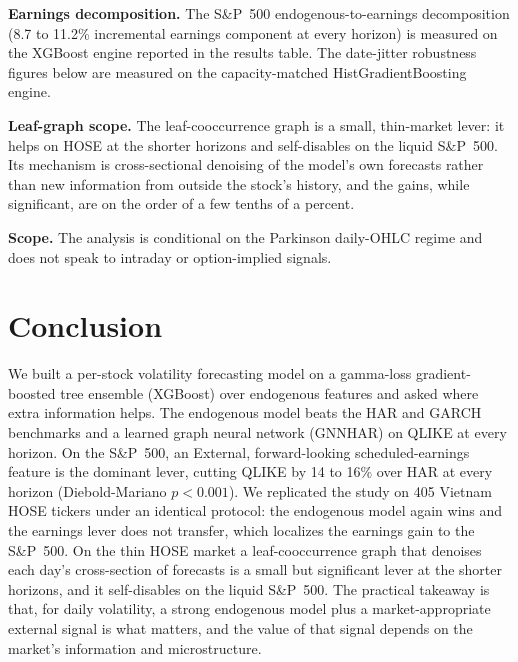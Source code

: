 \documentclass[runningheads]{llncs}
\begin{document}
\noindent\textbf{Earnings decomposition.} The S\&P~500 endogenous-to-earnings decomposition (8.7 to
11.2\% incremental earnings component at every horizon) is measured on the XGBoost engine reported in the
results table. The date-jitter robustness figures below are measured on the capacity-matched
HistGradientBoosting engine.

\noindent\textbf{Leaf-graph scope.} The leaf-cooccurrence graph is a small, thin-market lever: it helps
on HOSE at the shorter horizons and self-disables on the liquid S\&P~500. Its mechanism is
cross-sectional denoising of the model's own forecasts rather than new information from outside the
stock's history, and the gains, while significant, are on the order of a few tenths of a percent.

\noindent\textbf{Scope.} The analysis is conditional on the Parkinson daily-OHLC regime and does not
speak to intraday or option-implied signals.

\section{Conclusion}
We built a per-stock volatility forecasting model on a gamma-loss gradient-boosted tree ensemble
(XGBoost) over endogenous features and asked where extra information helps. The endogenous model beats
the HAR and GARCH benchmarks and a learned graph neural network (GNNHAR) on QLIKE at every horizon. On the
S\&P~500, an External, forward-looking scheduled-earnings feature is the dominant lever, cutting QLIKE by
14 to 16\% over HAR at every horizon (Diebold-Mariano $p<0.001$). We replicated the study on 405 Vietnam
HOSE tickers under an identical protocol: the endogenous model again wins and the earnings lever does
not transfer, which localizes the earnings gain to the S\&P~500. On the thin HOSE market a
leaf-cooccurrence graph that denoises each day's cross-section of forecasts is a small but significant
lever at the shorter horizons, and it self-disables on the liquid S\&P~500. The practical takeaway is
that, for daily volatility, a strong endogenous model plus a market-appropriate external signal is what
matters, and the value of that signal depends on the market's information and microstructure.
\end{document}
